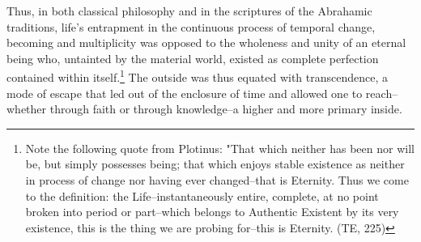 Thus, in both classical philosophy and in the scriptures of the
Abrahamic traditions, life's entrapment in the continuous process of temporal change, becoming and multiplicity was opposed to the wholeness and unity of an eternal being who, untainted by the material world, existed as complete perfection contained within itself.\footnote{Note the following quote from Plotinus: "That which neither has been nor will be, but simply possesses being; that which enjoys stable existence as neither in process of change nor having ever changed--that is Eternity. Thus we come to the definition: the Life--instantaneously entire, complete, at no point broken into period or part--which belongs to Authentic Existent by its very existence, this is the thing we are probing for--this is Eternity. (TE, 225) } The outside was thus equated with transcendence, a mode of escape that led out of the enclosure of time and allowed one to reach--whether through faith or through knowledge--a higher and more primary inside.

